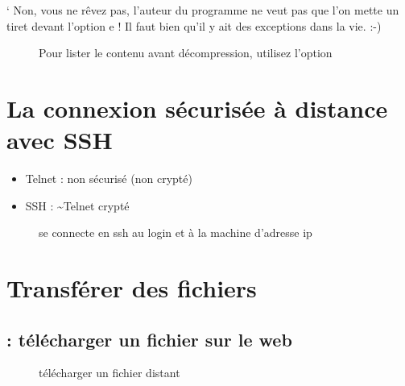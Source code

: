\documentclass[letterpaper,10pt,french]{sphinxmanual}
\begin{document}
{}`   Non, vous ne rêvez pas, l’auteur du programme ne veut pas que l’on mette un tiret devant l’option e ! Il faut bien qu’il y ait des exceptions dans la vie. :-)
\begin{description}
\item[{}] \leavevmode
Pour lister le contenu avant décompression, utilisez l’option
\begin{quote}

\end{quote}

\end{description}


\chapter{La connexion sécurisée à distance avec SSH}
\label{\detokenize{16-ssh:la-connexion-securisee-a-distance-avec-ssh}}\label{\detokenize{16-ssh::doc}}\begin{itemize}
\item {} 
Telnet : non sécurisé (non crypté)

\item {} 
SSH : \textasciitilde{}Telnet crypté

\end{itemize}
\begin{description}
\item[{}] \leavevmode
se connecte en ssh au login  et à la machine d’adresse ip 

\end{description}


\chapter{Transférer des fichiers}
\label{\detokenize{17-transferer-fichiers:transferer-des-fichiers}}\label{\detokenize{17-transferer-fichiers::doc}}

\section{ : télécharger un fichier sur le web}
\label{\detokenize{17-transferer-fichiers:wget-telecharger-un-fichier-sur-le-web}}\begin{description}
\item[{}] \leavevmode
télécharger un fichier distant

\end{description}
\end{document}
